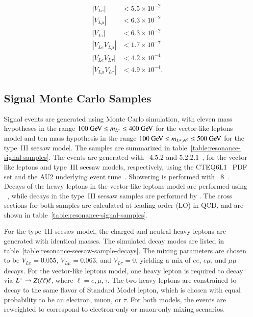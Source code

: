 \begin{align}
|V_{L e}| & <5.5\times10^{-2}\label{eqn:mixing-parameter-limits-1}\\
|V_{L \mu}| & <6.3\times10^{-2}\label{eqn:mixing-parameter-limits-2}\\
|V_{L \tau}| & <6.3\times10^{-2}\label{eqn:mixing-parameter-limits-3}\\
|V_{L e}V_{L\mu}| & <1.7\times10^{-7}\label{eqn:mixing-parameter-limits-4}\\
|V_{L e}V_{L\tau}| & <4.2\times10^{-4}\label{eqn:mixing-parameter-limits-5}\\
|V_{L \mu}V_{L\tau}| & <4.9\times10^{-4}\label{eqn:mixing-parameter-limits-6}.
\end{align}

\subsection{Signal Monte Carlo Samples}\label{sec:resonance-signal-mc-samples}

Signal events are generated using Monte Carlo simulation, with eleven mass hypotheses in the range $100 \GeV \leq m_{\lpm} \leq 400 \GeV$ for the vector-like leptons model and ten mass hypothesis in the range $100 \GeV \leq m_{\lpm,\lzero}\leq 500 \GeV$ for the type~III seesaw model. The samples are summarized in table~\ref{table:resonance-signal-samples}. The events are generated with \madgraph~4.5.2 and 5.2.2.1~\cite{madgraph}, for the vector-like leptons and type~III seesaw models, respectively, using the CTEQ6L1~\cite{ct6l1} PDF set and the AU2 underlying event tune~\cite{AU2}. Showering is performed with \pythia~8~\cite{Sjostrand:2008bk}. Decays of the heavy leptons in the vector-like leptons model are performed using \bridge~\cite{bridge}, while decays in the type~III seesaw samples are performed by \madgraph. The cross sections for both samples are calculated at leading order (LO) in QCD, and are shown in table~\ref{table:resonance-signal-samples}. 

For the type~III seesaw model, the charged and neutral heavy leptons are generated with identical masses. The simulated decay modes are listed in table~\ref{table:resonance-seesaw-sample-decays}. The mixing parameters are chosen to be $V_{L e}=0.055$, $V_{L\mu}=0.063$, and $V_{L\tau}=0$, yielding a mix of $ee$, $e\mu$, and $\mu\mu$ decays. For the vector-like leptons model, one heavy lepton is required to decay via $L^{\pm}\rightarrow Z(\ell\ell)\ell$, where $\ell=e,\mu,\tau$. The two heavy leptons are constrained to decay to the same flavor of Standard Model lepton, which is chosen with equal probability to be an electron, muon, or $\tau$. For both models, the events are reweighted to correspond to electron-only or muon-only mixing scenarios. 

